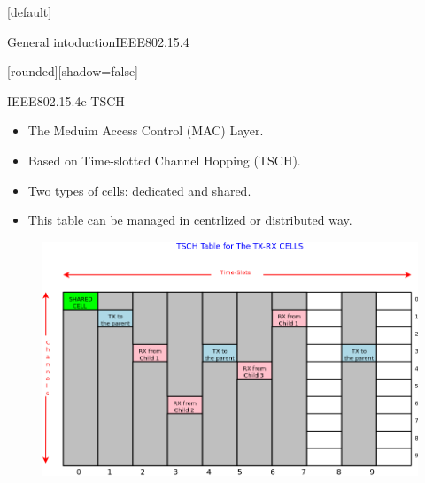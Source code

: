 \documentclass{beamer}
\makeatletter
\newenvironment{withoutheadline}{
        \setbeamertemplate{headline}[default]
        \def\beamer@entrycode{\vspace*{-\headheight}}
    }{}
\makeatother
\begin{document}
\begin{withoutheadline}
\begin{frame}{General intoduction}{IEEE802.15.4}

[rounded][shadow=false]




\begin{block}{IEEE802.15.4e TSCH}
    \begin{itemize}
    \item The Meduim Access Control (MAC) Layer.
    \item Based on Time-slotted Channel Hopping  (TSCH). 
    \item Two types of cells: dedicated and shared.
    \item This table can be managed in centrlized or distributed way. 
    
    \end{itemize}
    \end{block}

\centering
\begin{figure}[p]

\includegraphics[width=0.6\linewidth]{TSCH.png}
\end{figure}


\end{frame}
\end{withoutheadline}
\end{document}
